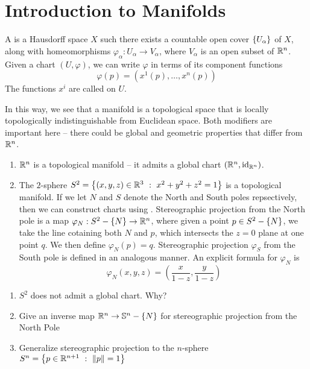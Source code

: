 %
\section{Introduction to Manifolds}
%
\begin{defn}
A  is a Hausdorff space $X$ such there exists a countable open cover $\left\lbrace U_\alpha \right\rbrace$
of $X$, along with homeomorphisms $\varphi_\alpha : U_\alpha \to V_\alpha$, where $V_\alpha$ is an open subset
of $\mathbb{R}^n$. Given a chart $(U, \varphi)$, we can write $\varphi$ in terms of its component functions
$$\varphi(p) = (x^1(p), \ldots, x^n(p)) $$
The functions $x^i$ are called  on $U$.
\end{defn}
%
In this way, we see that a manifold is a topological space that is locally topologically indistinguishable from
Euclidean space. Both modifiers are important here -- there could be global and geometric properties that
differ from $\mathbb{R}^n$.
%
\begin{exmp}\enumbreak
	\begin{enumerate}
		\item $\mathbb{R}^n$ is a topological manifold -- it admits a global chart $(\mathbb{R}^n, \operatorname{id}_{\mathbb{R}^n})$.
		\item The $2$-sphere $S^2 = \left\lbrace (x,y,z) \in \mathbb{R}^3 ~:~ x^2 + y^2 + z^2 = 1 \right\rbrace$ is a topological
		manifold. If we let $N$ and $S$ denote the North and South poles repsectively, then we can
		construct charts using . Stereographic projection from the North
		pole is a map $\varphi_N : S^2 - \left\lbrace N \right\rbrace \to \mathbb{R}^n$, where given a point $p \in S^2 - \left\lbrace N \right\rbrace$,
		we take the line cotaining both $N$ and $p$, which intersects the $z = 0 $ plane at one point
		$q$. We then define $\varphi_N(p) = q$. Stereographic projection $\varphi_S$ from the South
		pole is defined in an analogous manner. An explicit formula for $\varphi_N$ is
		$$\varphi_N(x,y,z) = \left(\frac{x}{1 - z}, \frac{y}{1 - z} \right) $$
	\end{enumerate}
\end{exmp}
%
\begin{exer}\enumbreak
	\begin{enumerate}
		\item $S^2$ does not admit a global chart. Why?
		\item Give an inverse map $\mathbb{R}^n \to \mathbb{S}^n - \left\lbrace N \right\rbrace$ for stereographic projection from the
			North Pole
		\item Generalize stereographic projection to the $n$-sphere
		$S^n = \left\lbrace p \in \mathbb{R}^{n+1} ~:~ \left\lVert p\right\rVert = 1 \right\rbrace$
	\end{enumerate}
\end{exer}
